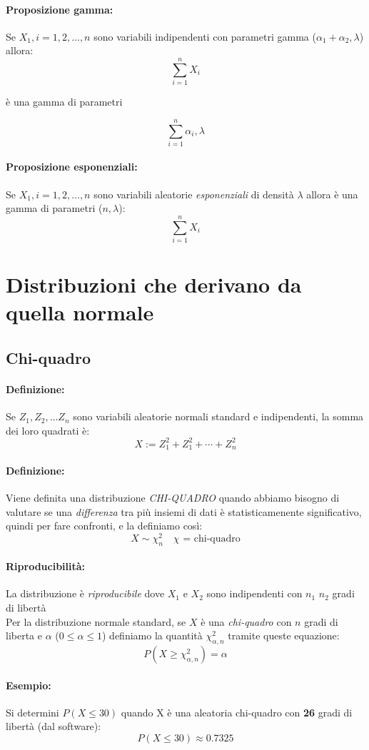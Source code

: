 \documentclass[]{article}
\newcommand{\definizione}{\paragraph{Definizione:}}
\begin{document}
    \paragraph{Proposizione gamma:} Se $X_1, i = 1, 2, \ldots, n$ sono variabili indipendenti con parametri gamma ($\alpha_1 + \alpha_2, \lambda$) allora:
    \[ \sum_{i = 1}^{n} X_i \]
    \centerline{è una gamma di parametri} 
    \[ \sum_{i = 1}^{n} \alpha_i, \lambda \]

    \paragraph{Proposizione esponenziali:} Se $X_1, i = 1, 2, \ldots, n$ sono variabili aleatorie \textit{esponenziali} di densità $\lambda$ allora è una gamma di parametri ($n, \lambda$):
    \[ \sum_{i = 1}^{n} X_i \]

    \section{Distribuzioni che derivano da quella normale}
    \subsection{Chi-quadro}
    \definizione Se $Z_1, Z_2, \ldots Z_n$ sono variabili aleatorie normali standard e indipendenti, la somma dei loro quadrati è:
    \[ X := Z_1^2 + Z_1^2 + \cdots + Z_n^2 \]
    \definizione Viene definita una distribuzione \textit{CHI-QUADRO} quando abbiamo bisogno di valutare se una \textit{differenza} tra più insiemi di dati
    è statisticamenente significativo, quindi per fare confronti, e la definiamo così:
    \[ X \sim \chi_n^2 \quad \text{$\chi$ = chi-quadro}\]
    \paragraph{Riproducibilità:}
    La distribuzione è \textit{riproducibile} dove $X_1$ e $X_2$ sono indipendenti con $n_1$ $n_2$ gradi di libertà \\
    Per la distribuzione normale standard, se $X$ è una \textit{chi-quadro} con $n$ gradi di liberta e $\alpha$ ($0 \leq \alpha \leq 1$) definiamo la quantità $\chi_{\alpha,n}^2$ tramite queste equazione:
    \[ P(X \geq \chi_{\alpha,n}^2) = \alpha \]
    \paragraph{Esempio:} Si determini $P(X \leq 30)$ quando X è una aleatoria chi-quadro con \textbf{26} gradi di libertà (dal software):
    \[ P(X \leq 30) \approx 0.7325 \]
\end{document}
